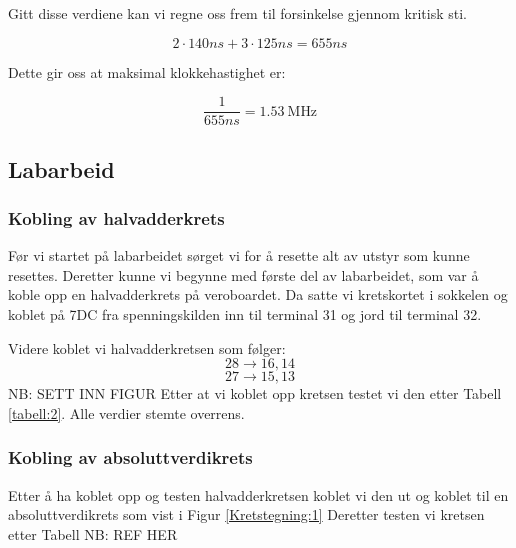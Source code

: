 Gitt disse verdiene kan vi regne oss frem til forsinkelse gjennom kritisk sti.

\begin{displaymath}
  2 \cdot 140ns + 3 \cdot 125ns = 655ns
\end{displaymath}

Dette gir oss at maksimal klokkehastighet er:

\begin{displaymath}
  \frac{1}{655ns} = \SI{1.53}{\mega\hertz}
\end{displaymath}

\subsection{Labarbeid}

\subsubsection*{Kobling av halvadderkrets}

Før vi startet på labarbeidet sørget vi for å resette alt av utstyr som kunne resettes.
Deretter kunne vi begynne med første del av labarbeidet, som var å koble opp en halvadderkrets på veroboardet.
Da satte vi kretskortet i sokkelen og koblet på 7DC fra spenningskilden inn til terminal 31 og jord til terminal 32.

Videre koblet vi halvadderkretsen som følger:
\begin{displaymath}
  28 \rightarrow 16, 14
\end{displaymath}
\begin{displaymath}
  27 \rightarrow 15, 13
\end{displaymath}
NB: SETT INN FIGUR
Etter at vi koblet opp kretsen testet vi den etter Tabell \ref{tabell:2}. Alle verdier stemte overrens.

\subsubsection*{Kobling av absoluttverdikrets}

Etter å ha koblet opp og testen halvadderkretsen koblet vi den ut og koblet til en absoluttverdikrets som vist i Figur \ref{Kretstegning:1}
Deretter testen vi kretsen etter Tabell NB: REF HER
